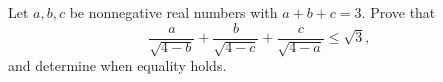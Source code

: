 Let $a,b,c$ be nonnegative real numbers with $a+b+c=3$. Prove that
\[
\dfrac{a}{\sqrt{4-b}}+\dfrac{b}{\sqrt{4-c}}+\dfrac{c}{\sqrt{4-a}}\le\sqrt3 ,
\]
and determine when equality holds.
